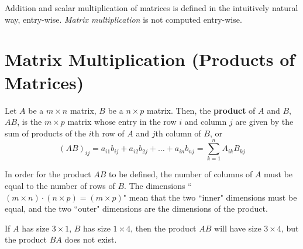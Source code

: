 \documentclass[letterpaper,12pt]{article}
\begin{document}
Addition and scalar multiplication of matrices is defined in the intuitively natural way, entry-wise. \textit{Matrix multiplication} is not computed entry-wise.

\section*{Matrix Multiplication (Products of Matrices)}
\begin{definition}
Let $A$ be a $m \times n$ matrix, $B$ be a $n \times p$ matrix. Then, the \textbf{product} of $A$ and $B$, $AB$, is the $m \times p$ matrix whose entry in the row $i$ and column $j$ are given by the sum of products of the $i$th row of $A$ and $j$th column of $B$, or
\begin{equation*}
    \boxed{(AB)_{ij} = a_{i1} b_{ij} + a_{i2} b_{2j} + \dots + a_{in} b_{nj} = \sum_{k=1}^n A_{ik} B_{kj}}
\end{equation*}
\end{definition}

In order for the product $AB$ to be defined, the number of columns of $A$ must be equal to the number of rows of $B$. The dimensions ``$(m \times n) \cdot (n \times p) = (m \times p)$" mean that the two ``inner" dimensions must be equal, and the two ``outer" dimensions are the dimensions of the product.

\begin{example}
If $A$ has size $3 \times 1$, $B$ has size $1 \times 4$, then the product $AB$ will have size $3 \times 4$, but the product $BA$ does not exist.
\end{example}
\end{document}
